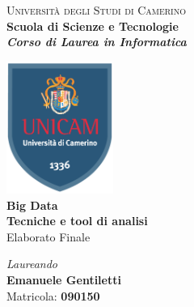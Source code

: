 \newenvironment{changemargin}[2]{%
\begin{list}{}{%
\setlength{\topsep}{0pt}%
\setlength{\leftmargin}{1cm}%
\setlength{\rightmargin}{1cm}%
\setlength{\listparindent}{\parindent}%
\setlength{\itemindent}{\parindent}%
\setlength{\parsep}{\parskip}%
}%
\item[]}{\end{list}}

\begin{titlepage}
\begin{center}
\vspace{1cm}
{{\Huge{\textsc{Università degli Studi di Camerino\\}}}}
\vspace{3mm}
\huge{\bf Scuola di Scienze e Tecnologie\\}
\vspace{3mm}
\LARGE{\textsl{ \textbf{Corso di Laurea in Informatica}}}
\end{center}
\vspace{14mm}
\begin{center}
\includegraphics[width=3.5cm]{img/unicam_logo.pdf}\\
\vspace{1.5cm}
{\Huge{\bf Big Data}}\\
\vspace{5mm}
{\huge{\bf Tecniche e tool di analisi}}\\
\vspace{15mm} {\huge{Elaborato Finale}}
\end{center}
\vspace{25mm}
\par
\noindent
\begin{minipage}[t]{0.47\textwidth}
    \begin{center}
    {\LARGE{\textsl{Laureando}
    \vspace{0.2cm}\\
    \textbf{Emanuele Gentiletti}\\
    \vspace{1.7cm}
    Matricola: \textbf{090150}
    }}


\end{center}
\end{minipage}
\end{titlepage}

